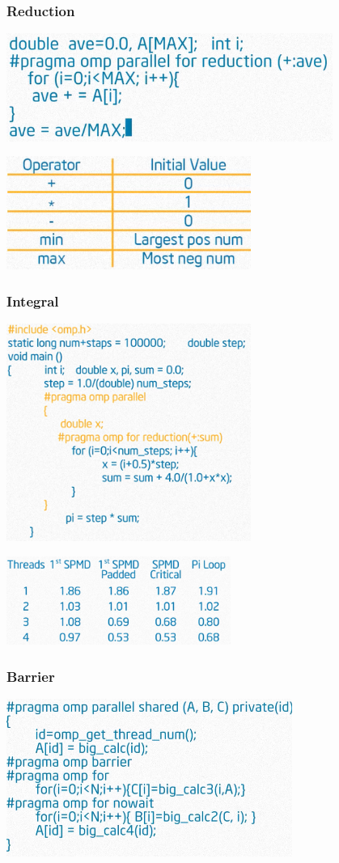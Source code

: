 \documentclass{beamer}
\begin{document}
\begin{frame}
  \frametitle{Reduction}
  \centering
  \includegraphics[width=0.8\textwidth]{reduction} \pause
  
  \includegraphics[width=0.6\textwidth]{reduction-init}    
\end{frame}


\begin{frame}[plain]
  \frametitle{Integral}
  \centering
  \includegraphics[width=0.6\textwidth]{integral-worksharing}\pause

  \includegraphics[width=0.55\textwidth]{integral-worksharing-time}
\end{frame}


\begin{frame}
  \frametitle{Barrier}
  \centering
  \includegraphics[width=0.7\textwidth]{barrier}
\end{frame}
\end{document}
